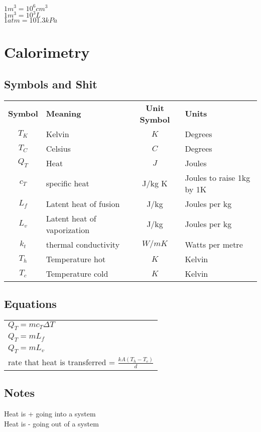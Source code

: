 \documentclass[12pt, letterpaper, twoside]{article}
\begin{document}
    
    $1 m^3 = 10^6 cm^3$\\
    $1 m^3 = 10^3 L$\\
    $1 atm = 101.3 kPa$\\
    
  
\section{Calorimetry}
  \subsection*{Symbols and Shit}
    \begin{tabular}{c l c l}
  	  \textbf{Symbol} & \textbf{Meaning} & \textbf{Unit Symbol} & \textbf{Units}\\
  	  $T_K$ & Kelvin & $K$ & Degrees\\
  	  $T_C$ & Celsius & $C$ & Degrees\\
  	  $Q_T$ & Heat & $J$ & Joules\\ 
  	  $c_T$ & specific heat & J/kg K & Joules to raise 1kg by 1K\\
  	  $L_f$ & Latent heat of fusion & J/kg & Joules per kg\\
  	  $L_v$ & Latent heat of vaporization & J/kg & Joules per kg\\
  	  $k_t$ & thermal conductivity & $W/m K$ & Watts per metre\\
  	  $T_h$ & Temperature hot & $K$ & Kelvin\\
  	  $T_c$ & Temperature cold & $K$ & Kelvin\\
    \end{tabular}
  
  \subsection*{Equations}
    \begin{tabular}{l}
      $Q_T = mc_T \Delta T$\\
      $Q_T = mL_f$\\
      $Q_T = mL_v$\\
      rate that heat is transferred = $\frac{kA(T_h - T_c)}{d}$
    \end{tabular}
  
  \subsection*{Notes}
    Heat is + going into a system\\
    Heat is - going out of a system\\
  
\end{document}
